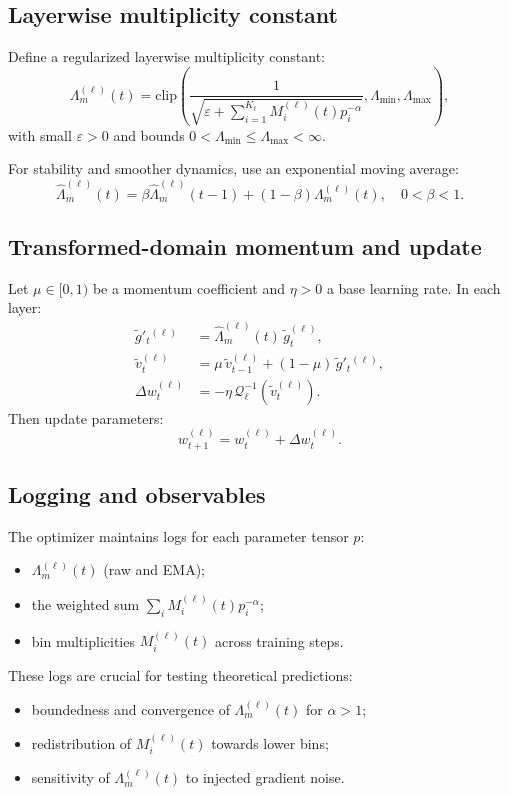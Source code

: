 \documentclass[11pt]{article}
\begin{document}
\subsection{Layerwise multiplicity constant}

Define a regularized layerwise multiplicity constant:
\begin{equation}
\Lambda_m^{(\ell)}(t)
=
\mathrm{clip}
\left(
\frac{1}{\sqrt{\varepsilon + \sum_{i=1}^{K_\ell} M_i^{(\ell)}(t) p_i^{-\alpha}}},
\Lambda_{\min}, \Lambda_{\max}
\right),
\end{equation}
with small $\varepsilon>0$ and bounds $0<\Lambda_{\min}\le \Lambda_{\max}<\infty$.

For stability and smoother dynamics, use an exponential moving average:
\begin{equation}
\widehat{\Lambda}_m^{(\ell)}(t)
=
\beta \widehat{\Lambda}_m^{(\ell)}(t-1)
+ (1-\beta)\Lambda_m^{(\ell)}(t),
\quad 0<\beta<1.
\end{equation}

\subsection{Transformed-domain momentum and update}

Let $\mu \in [0,1)$ be a momentum coefficient and $\eta > 0$ a base learning rate. In each layer:
\begin{align}
\tilde g'_t{}^{(\ell)} &= \widehat{\Lambda}_m^{(\ell)}(t)\,\tilde g_t^{(\ell)},\\
\tilde v_t^{(\ell)} &= \mu\,\tilde v_{t-1}^{(\ell)} + (1-\mu)\,\tilde g'_t{}^{(\ell)},\\
\Delta w_t^{(\ell)} &= -\eta\,\mathcal{Q}_\ell^{-1}(\tilde v_t^{(\ell)}).
\end{align}
Then update parameters:
\[
w_{t+1}^{(\ell)} = w_t^{(\ell)} + \Delta w_t^{(\ell)}.
\]

\subsection{Logging and observables}

The optimizer maintains logs for each parameter tensor $p$:
\begin{itemize}[leftmargin=*]
  \item $\Lambda_m^{(\ell)}(t)$ (raw and EMA);
  \item the weighted sum $\sum_i M_i^{(\ell)}(t)p_i^{-\alpha}$;
  \item bin multiplicities $M_i^{(\ell)}(t)$ across training steps.
\end{itemize}
These logs are crucial for testing theoretical predictions:
\begin{itemize}[leftmargin=*]
  \item boundedness and convergence of $\Lambda_m^{(\ell)}(t)$ for $\alpha>1$;
  \item redistribution of $M_i^{(\ell)}(t)$ towards lower bins;
  \item sensitivity of $\Lambda_m^{(\ell)}(t)$ to injected gradient noise.
\end{itemize}
\end{document}

